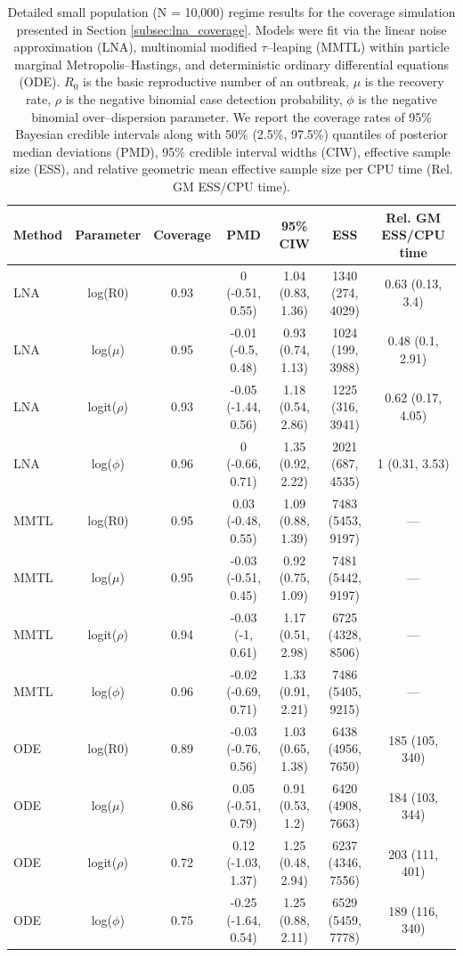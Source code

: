 \begin{table}
	\begin{fullpage}
		\small
		\centering
		\begin{tabular}{lcccccc}
			\hline
			Method & Parameter & Coverage & PMD & 95\% CIW & ESS & Rel. GM ESS/CPU time \\ 
			\hline
			LNA & log(R0) & 0.93 & 0 (-0.51, 0.55) & 1.04 (0.83, 1.36) & 1340 (274, 4029) & 0.63 (0.13, 3.4) \\ 
			LNA & log($\mu$) & 0.95 & -0.01 (-0.5, 0.48) & 0.93 (0.74, 1.13) & 1024 (199, 3988) & 0.48 (0.1, 2.91) \\ 
			LNA & logit($\rho$) & 0.93 & -0.05 (-1.44, 0.56) & 1.18 (0.54, 2.86) & 1225 (316, 3941) & 0.62 (0.17, 4.05) \\ 
			LNA & log($\phi$) & 0.96 & 0 (-0.66, 0.71) & 1.35 (0.92, 2.22) & 2021 (687, 4535) & 1 (0.31, 3.53) \\ 
			MMTL & log(R0) & 0.95 & 0.03 (-0.48, 0.55) & 1.09 (0.88, 1.39) & 7483 (5453, 9197) & --- \\ 
			MMTL & log($\mu$) & 0.95 & -0.03 (-0.51, 0.45) & 0.92 (0.75, 1.09) & 7481 (5442, 9197) & --- \\ 
			MMTL & logit($\rho$) & 0.94 & -0.03 (-1, 0.61) & 1.17 (0.51, 2.98) & 6725 (4328, 8506) & --- \\ 
			MMTL & log($\phi$) & 0.96 & -0.02 (-0.69, 0.71) & 1.33 (0.91, 2.21) & 7486 (5405, 9215) & --- \\ 
			ODE & log(R0) & 0.89 & -0.03 (-0.76, 0.56) & 1.03 (0.65, 1.38) & 6438 (4956, 7650) & 185 (105, 340) \\ 
			ODE & log($\mu$) & 0.86 & 0.05 (-0.51, 0.79) & 0.91 (0.53, 1.2) & 6420 (4908, 7663) & 184 (103, 344) \\ 
			ODE & logit($\rho$) & 0.72 & 0.12 (-1.03, 1.37) & 1.25 (0.48, 2.94) & 6237 (4346, 7556) & 203 (111, 401) \\ 
			ODE & log($\phi$) & 0.75 & -0.25 (-1.64, 0.54) & 1.25 (0.88, 2.11) & 6529 (5459, 7778) & 189 (116, 340) \\ 
			\hline
		\end{tabular}
		\caption[Small population coverage results for SIR models fit via the LNA, ODE, and MMTL approximations.]{Detailed small population (N = 10,000) regime results for the coverage simulation presented in Section \ref{subsec:lna_coverage}. Models were fit via the linear noise approximation (LNA), multinomial modified $ \tau $--leaping (MMTL) within particle marginal Metropolis--Hastings, and deterministic ordinary differential equations (ODE). $ R_0 $ is the basic reproductive number of an outbreak, $ \mu $ is the recovery rate, $ \rho $ is the negative binomial case detection probability, $ \phi $ is the negative binomial over--dispersion parameter. We report the coverage rates of 95\% Bayesian credible intervals along with 50\% (2.5\%, 97.5\%) quantiles of posterior median deviations (PMD), 95\% credible interval widths (CIW), effective sample size (ESS), and relative geometric mean effective sample size per CPU time (Rel. GM ESS/CPU time).}
	\end{fullpage}
\end{table}	

